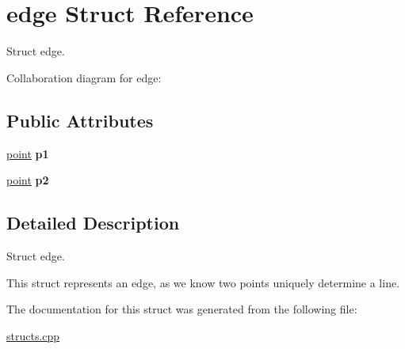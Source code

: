\hypertarget{structedge}{}\section{edge Struct Reference}
\label{structedge}


Struct edge.  




Collaboration diagram for edge\+:
\subsection*{Public Attributes}
\begin{DoxyCompactItemize}
\item 
\hyperlink{structpoint}{point} {\bfseries p1}\hypertarget{structedge_a7b074374ee3059d29a93e9e76480274e}{}\label{structedge_a7b074374ee3059d29a93e9e76480274e}

\item 
\hyperlink{structpoint}{point} {\bfseries p2}\hypertarget{structedge_a105ba74e7b01aba7e0e113ab286dc883}{}\label{structedge_a105ba74e7b01aba7e0e113ab286dc883}

\end{DoxyCompactItemize}


\subsection{Detailed Description}
Struct edge. 

This struct represents an edge, as we know two points uniquely determine a line. 

The documentation for this struct was generated from the following file\+:\begin{DoxyCompactItemize}
\item 
\hyperlink{structs_8cpp}{structs.\+cpp}\end{DoxyCompactItemize}
